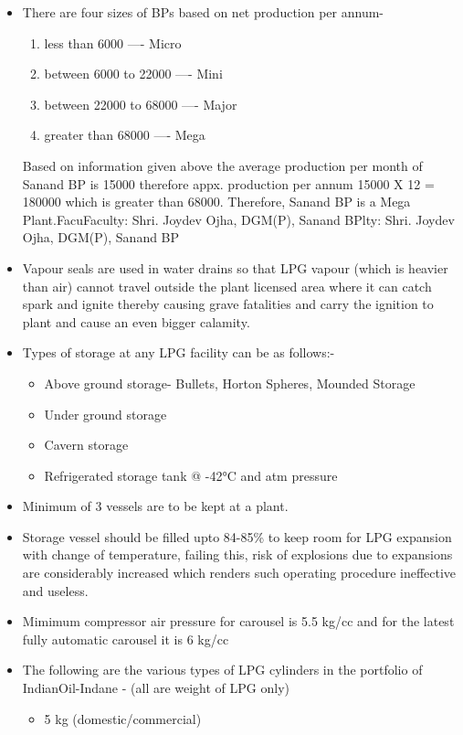 \documentclass{report}
\begin{document}
	\begin{itemize}
		\item There are four sizes of BPs based on net production per annum-
		\begin{enumerate}
			\item less than 6000 ---- Micro
			\item between 6000 to 22000 ---- Mini
			\item between 22000 to 68000 ---- Major
			\item greater than 68000 ---- Mega
		\end{enumerate}
		Based on information given above the average production per month of Sanand BP is 15000 therefore appx. production per annum 15000 X 12 = 180000 which is greater than 68000. Therefore, Sanand BP is a Mega Plant.FacuFaculty: Shri. Joydev Ojha, DGM(P), Sanand BPlty: Shri. Joydev Ojha, DGM(P), Sanand BP
		\item Vapour seals are used in water drains so that LPG vapour (which is heavier than air) cannot travel outside the plant licensed area where it can catch spark and ignite thereby causing grave fatalities and carry the ignition to plant and cause an even bigger calamity.
		\item Types of storage at any LPG facility can be as follows:-
		\begin{itemize}
			\item Above ground storage- Bullets, Horton Spheres, Mounded Storage
			\item Under ground storage
			\item Cavern storage
			\item Refrigerated storage tank @ \ang{-42}C and atm pressure
		\end{itemize}
		\item Minimum of 3 vessels are to be kept at a plant.
		\item Storage vessel should be filled upto 84-85\% to keep room for LPG expansion with change of temperature, failing this, risk of explosions due to expansions are considerably increased which renders such operating procedure ineffective and useless. 
		\item Mimimum compressor air pressure for carousel is 5.5 kg/cc and for the latest fully automatic carousel it is 6 kg/cc
		\item The following are the various types of LPG cylinders in the portfolio of IndianOil-Indane - (all are weight of LPG only)
		\begin{itemize}
			\item 5 kg (domestic/commercial)

\end{itemize}
\end{itemize}
\end{document}

